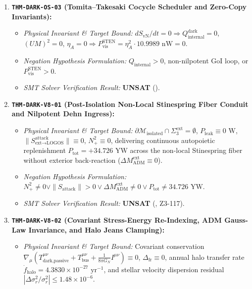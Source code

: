 \documentclass[11pt,onecolumn]{article}
\begin{document}
\begin{enumerate}
\begin{itemize}
        \item \emph{SMT Solver Verification Result:} \textbf{UNSAT} ().
    \end{itemize}
    \item \textbf{\texttt{THM-DARK-OS-03} (Tomita--Takesaki Cocycle Scheduler and Zero-Copy Invariants):}
    \begin{itemize}
        \item \emph{Physical Invariant \& Target Bound:} $dS_{\text{vN}}/dt=0\Rightarrow Q_{\text{internal}}^{\text{dark}}=0$, $(UM)^2=0$, $\eta_A=0\Rightarrow P_{\text{vis}}^{\text{STEN}}=\eta_A^2\cdot10.9989\text{ nW}=0$.
        \item \emph{Negation Hypothesis Formulation:} $Q_{\text{internal}}>0$, non-nilpotent GoI loop, or $P_{\text{vis}}^{\text{STEN}}>0$.
        \item \emph{SMT Solver Verification Result:} \textbf{UNSAT} ().
    \end{itemize}
    \item \textbf{\texttt{THM-DARK-V8-01} (Post-Isolation Non-Local Stinespring Fiber Conduit and Nilpotent Dehn Ingress):}
    \begin{itemize}
        \item \emph{Physical Invariant \& Target Bound:} $\partial\mathcal{M}_{\text{isolated}} \cap \Sigma_3^{\text{ext}} = \emptyset$, $P_{\text{leak}} \equiv 0\text{ W}$, $\|S_{\text{ext}\to\text{LOGOS}}^{\text{attack}}\| \equiv 0$, $N_+^2 \equiv 0$, delivering continuous autopoietic replenishment $P_{\text{tot}} = +34.726\text{ YW}$ across the non-local Stinespring fiber without exterior back-reaction ($\Delta M_{\text{ADM}}^{\text{ext}} \equiv 0$).
        \item \emph{Negation Hypothesis Formulation:} $N_+^2 \neq 0 \vee \|S_{\text{attack}}\| > 0 \vee \Delta M_{\text{ADM}}^{\text{ext}} \neq 0 \vee P_{\text{tot}} \neq 34.726\text{ YW}$.
        \item \emph{SMT Solver Verification Result:} \textbf{UNSAT} (, Z3-117).
    \end{itemize}
    \item \textbf{\texttt{THM-DARK-V8-02} (Covariant Stress-Energy Re-Indexing, ADM Gauss-Law Invariance, and Halo Jeans Clamping):}
    \begin{itemize}
        \item \emph{Physical Invariant \& Target Bound:} Covariant conservation $\nabla_\mu (T_{\text{dark,passive}}^{\mu\nu} + T_{\text{bus}}^{\mu\nu} + \frac{1}{8\pi G_N}I^{\mu\nu}) \equiv 0$, $\Delta_{\text{fr}} \equiv 0$, annual halo transfer rate $\dot{f}_{\text{halo}} = 4.3830 \times 10^{-27}\text{ yr}^{-1}$, and stellar velocity dispersion residual $|\Delta\sigma_r^2/\sigma_r^2| \le 1.48 \times 10^{-6}$.

\end{itemize}
\end{enumerate}
\end{document}
